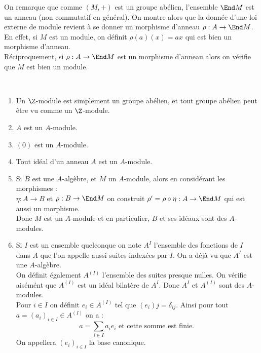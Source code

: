 \begin{example}
 On remarque que comme $(M,+)$ est un groupe abélien, l'ensemble $\End M$ est
un anneau (non commutatif en général). On montre alors que la donnée d'une loi
externe de module revient à se donner un morphisme d'anneau $\rho : A\rightarrow
\End M$.\\
En effet, si $M$ est un module, on définit $\rho(a)(x) = ax$ qui est bien un
morphisme d'anneau.\\
Réciproquement, si $\rho : A \rightarrow \End M$ est un morphisme d'anneau
alors on vérifie que $M$ est bien un module.
\end{example}

\begin{example}[Exemples]\
\begin{enumerate}
 \item Un $\Z$-module est simplement un groupe abélien, et tout groupe abélien
peut être vu comme un $\Z$-module.
 \item $A$ est un $A$-module.
 \item $(0)$ est un $A$-module.
 \item Tout idéal d'un anneau $A$ est un $A$-module.
 \item Si $B$ est une $A$-algèbre, et $M$ un $A$-module, alors en considérant
les morphismes :\\
$\eta : A \rightarrow B$ et $\rho : B \rightarrow \End M$ on construit $\rho'
=\rho\circ \eta : A\rightarrow \End M$ qui est aussi un morphisme.\\ Donc $M$
est un $A$-module et en particulier, $B$ et ses idéaux sont des $A$-modules.
\item Si $I$ est un ensemble quelconque on note $A^I$ l'ensemble des fonctions
de $I$ dans $A$ que l'on appelle aussi suites indexées par $I$. On a déjà vu
que $A^I$ est une $A$-algèbre.\\
On définit également $A^{(I)}$ l'ensemble des suites presque nulles. On vérifie
aisémént que $A^{(I)}$ est un idéal bilatère de $A^I$. Donc $A^I$ et $A^{(I)}$
sont des $A$-modules.\\
Pour $i\in I$ on définit $e_i\in A^{(I)}$ tel que $(e_i)j = \delta_{ij}$. Ainsi
pour tout $a = (a_i)_{i\in I} \in A^{(I)}$ on a :
\begin{displaymath}
 a = \sum_{i\in I} a_ie_i \text{ et cette somme est finie. }
\end{displaymath}
On appellera $(e_i)_{i\in I}$ la base canonique.
\end{enumerate}
\end{example}

